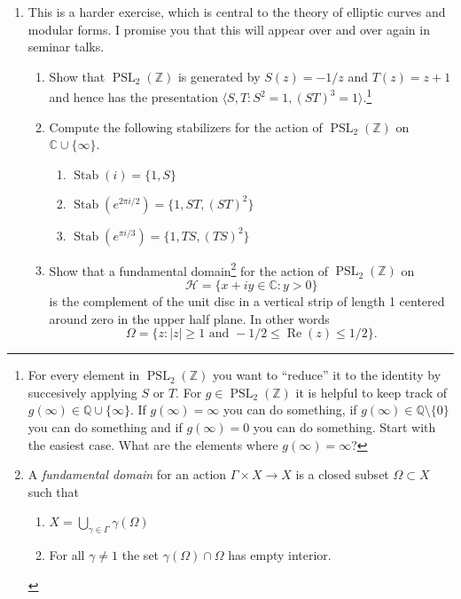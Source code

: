 \documentclass[a4paper,10pt]{article}
\newcommand{\ZZ}{\mathbb{Z}}
\newcommand{\CC}{\mathbb{C}}
\newcommand{\PSL}{\operatorname{PSL}}
\newcommand{\Stab}{\operatorname{Stab}}
\renewcommand{\Re}{\operatorname{Re}}
\begin{document}
\begin{enumerate}
\item This is a harder exercise, which is central to the theory of elliptic curves and modular forms. I promise you that this will appear over and over again in seminar talks.
\begin{enumerate}
	\item Show that $\PSL_2(\ZZ)$ is generated by $S(z) = -1/z$ and $T(z) = z+1$ and hence has the presentation $\langle S, T : S^2 = 1, (ST)^3 = 1 \rangle. $\footnote{
	For every element in $\PSL_2(\ZZ)$ you want to ``reduce'' it to the identity by succesively applying $S$ or $T$.
	For $g\in \PSL_2(\ZZ)$ it is helpful to keep track of $g(\infty) \in \mathbb{Q} \cup \lbrace \infty \rbrace$. 
	If $g(\infty)=\infty$ you can do something, if $g(\infty)\in \mathbb{Q}\setminus \lbrace 0 \rbrace$ you can do something and if $g(\infty)=0$ you can do something.
	Start with the easiest case. 
	What are the elements where $g(\infty)=\infty$?
}

	
	\item 
Compute the following stabilizers for the action of $\PSL_2(\ZZ)$ on $\CC \cup \lbrace \infty \rbrace$.
	\begin{enumerate}
		\item $\Stab(i) = \lbrace 1, S\rbrace$
		\item $\Stab(e^{2\pi i/2}) = \lbrace 1, ST, (ST)^2 \rbrace $
		\item $\Stab(e^{\pi i/3}) = \lbrace 1, TS, (TS)^2 \rbrace $
	\end{enumerate}
	
\item Show that a fundamental domain\footnote{\newline A \emph{fundamental domain} for an action $\Gamma \times X \to X$ is a closed subset $\Omega \subset X$ such that 
	\begin{enumerate}
		\item $X = \bigcup_{\gamma \in \Gamma} \gamma(\Omega)$
		\item For all $\gamma \neq 1$ the set $\gamma(\Omega) \cap \Omega$ has empty interior.
	\end{enumerate}
} for the action of $\PSL_2(\ZZ)$ on 
$$\mathcal{H} = \lbrace x+i y \in \CC \colon y >0 \rbrace $$
is the complement of the unit disc in a vertical strip of length 1 centered around zero in the upper half plane. In other words
$$ \Omega =  \lbrace z: \vert z \vert \geq 1 \mbox{ and } -1/2\leq \Re(z) \leq 1/2 \rbrace.$$

\end{enumerate}

\end{enumerate}
\end{document}
